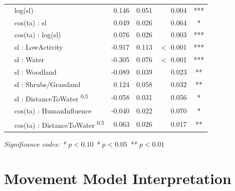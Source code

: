 \documentclass[../FinalThesis.tex]{subfiles}
\begin{document}
\begin{table}[!ht]
\begin{center}
\begin{threeparttable}
\begin{tabular}{llrrrc}
            & log(sl)                                         & 0.146       & 0.051 & 0.004       & ***   \\
            & cos(ta) : sl                                    & 0.049       & 0.026 & 0.064       & *     \\
            & cos(ta) : log(sl)                               & 0.076       & 0.026 & 0.003       & ***   \\
            & sl : LowActivity                                & -0.917      & 0.113 & \(<\) 0.001 & ***   \\
     \hdashline
     \multirow{5}{*}{Interactions}
            & sl : Water                                      & -0.305      & 0.076 & \(<\) 0.001 & ***   \\
            & sl : Woodland                                   & -0.089      & 0.039 & 0.023       & **    \\
            & sl : Shrubs/Grassland                           & 0.124       & 0.058 & 0.032       & **    \\
            & sl : DistanceToWater \textsuperscript{0.5}      & -0.058      & 0.031 & 0.056       & *     \\
            & cos(ta) : HumanInfluence                        & -0.040      & 0.022 & 0.070       & *     \\
            & cos(ta) : DistanceToWater \textsuperscript{0.5} & 0.063       & 0.026 & 0.017       & **    \\
     \bottomrule
    \end{tabular}
    \begin{tablenotes}
     \item \textit{Significance codes: * \(p < 0.10\) \quad ** \(p < 0.05\)
      \quad *** \(p < 0.01\)}
    \end{tablenotes}
   \end{threeparttable}
 \end{center}
\end{table}


\newpage
\section{Movement Model Interpretation}
\label{ModelInterpretation}
\end{document}
